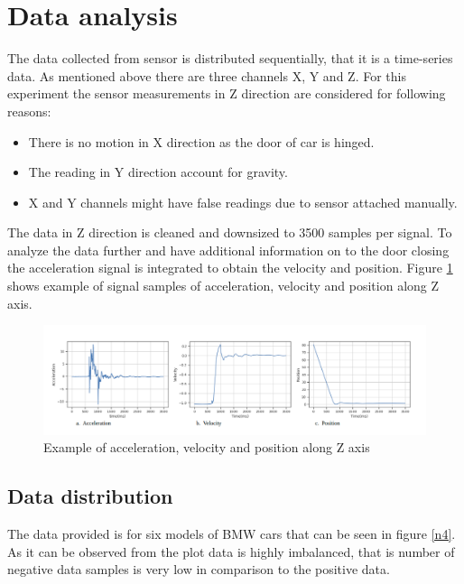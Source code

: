    \section{Data analysis}
   The data collected from sensor is distributed sequentially, that it is a time-series data. As mentioned above there are three channels X, Y and Z. For this experiment the sensor measurements in Z direction are  considered for following reasons:
   
   \begin{itemize}
   	\item There is no motion in X direction as the door of car is hinged.
   	\item The reading in Y direction account for gravity.
   	\item X and Y channels might have false readings due to sensor attached manually.
   	
   	
   \end{itemize}
   
   The data in Z direction is cleaned and downsized to 3500 samples per signal. To analyze the data further and have additional information on to the door closing the acceleration signal is integrated to obtain the velocity and position. Figure \ref{n3} shows example of signal samples of acceleration, velocity and position along Z axis.
   
    \begin{figure}[h]
    	\centering
    	\includegraphics[width=1\linewidth]{images/signalall.png}
    	\caption{Example of acceleration, velocity and position along Z axis}
    	\label{n3}
    \end{figure}
   
  \subsection{Data distribution} 
   The data provided is for six models of BMW cars that can be seen in figure \ref{n4}. As it can be observed from the plot data is highly imbalanced, that is number of negative data samples is very low in comparison to the positive data. 
   
